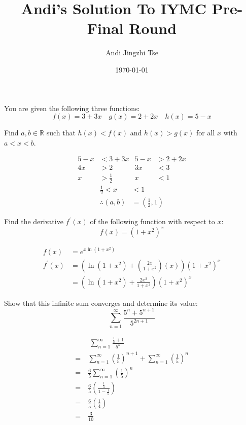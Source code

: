 \documentclass{article}
\title{Andi's Solution To IYMC Pre-Final Round}
\author{Andi Jingzhi Tse}
\date{\today}
\begin{document}
\maketitle


\begin{custom-big}[Problem A.1]
You are given the following three functions:
$$
f(x)=3+3 x \quad g(x)=2+2 x \quad h(x)=5-x
$$

Find $a, b \in \mathbb{R}$ such that $h(x)<f(x)$ and $h(x)>g(x)$ for all $x$ with $a<x<b$.
\end{custom-big}

\begin{solution}
\begin{align*}
    5-x&<3+3x&5-x&>2+2x\\
    4x&>2&3x&<3\\
    x&>\frac 12&x&<1
\end{align*}
\begin{align*}
    \frac 12<x&<1\\
    \therefore (a,b)&=\left(\frac 12,1\right)
\end{align*}
\end{solution}

\begin{custom-big}[Problem A.2]
Find the derivative $f^{\prime}(x)$ of the following function with respect to $x$:
$$
f(x)=\left(1+x^2\right)^x
$$
\end{custom-big}

\begin{solution}
\begin{align*}
f(x) & =e^{x \ln \left(1+x^2\right)} \\
f^{\prime}(x) & =\left(\ln \left(1+x^2\right)+\left(\frac{2 x}{1+x^2}\right)(x)\right)\left(1+x^2\right)^x \\
& =\left(\ln \left(1+x^2\right)+\frac{2 x^2}{1+x^2}\right)\left(1+x^2\right)^x
\end{align*}
\end{solution}

\pagebreak
\begin{custom-big}[Problem B.1]
Show that this infinite sum converges and determine its value:
$$
\sum_{n=1}^{\infty} \frac{5^n+5^{n+1}}{5^{2 n+1}}
$$
\end{custom-big}

\begin{solution}
\begin{align*}
&\  \sum_{n=1}^{\infty} \frac{\frac{1}{5}+1}{5^n} \\
=\  & \sum_{n=1}^{\infty}\left(\frac{1}{5}\right)^{n+1}+\sum_{n=1}^{\infty}\left(\frac{1}{5}\right)^n \\
=\  & \frac{6}{5} \sum_{n=1}^{\infty}\left(\frac{1}{5}\right)^n \\
=\  & \frac{6}{5}\left(\frac{\frac{1}{5}}{1-\frac{1}{5}}\right) \\
=\  & \frac{6}{5}\left(\frac{1}{4}\right) \\
=\  & \frac{3}{10}
\end{align*}
\end{solution}
\end{document}
